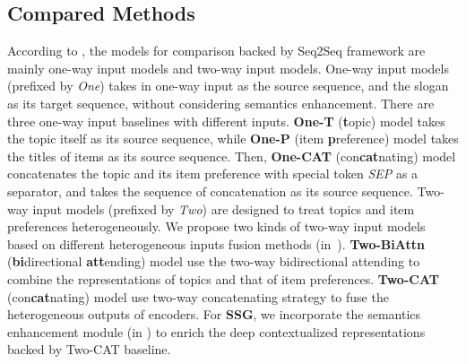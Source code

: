 \subsection{Compared Methods}
\label{sec:compared}

According to ,
the models for comparison backed by Seq2Seq framework are mainly one-way input models and two-way input models.
One-way input models (prefixed by \emph{One}) takes in one-way input as the source sequence,
and the slogan as its target sequence, without considering semantics enhancement.
There are three one-way input baselines with different inputs.
\textbf{One-T} (\textbf{t}opic) model
takes the topic itself as its source sequence,
while \textbf{One-P} (item \textbf{p}reference) model takes
the titles of items as its source sequence.
Then, 
\textbf{One-CAT} (con\textbf{cat}nating) model 
concatenates the topic and its item preference with special token \emph{SEP}
as a separator, and takes the sequence of concatenation as its source sequence.
Two-way input models (prefixed by \emph{Two})
are designed to treat topics and item preferences heterogeneously.
We propose two kinds of two-way input models
based on different heterogeneous inputs fusion methods 
(in~).
\textbf{Two-BiAttn} (\textbf{bi}directional \textbf{att}ending) model use the two-way bidirectional attending
to combine the representations of topics and that of item preferences.
\textbf{Two-CAT} (con\textbf{cat}nating) model use two-way concatenating strategy 
to fuse the heterogeneous outputs of encoders.
For \textbf{SSG}, 
we incorporate the semantics enhancement module
(in ) to enrich
the deep contextualized representations
backed by Two-CAT baseline.


